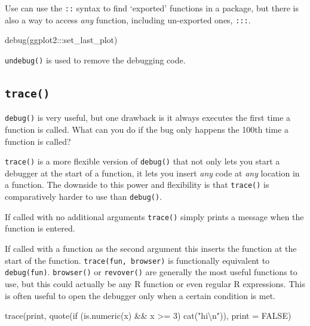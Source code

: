 \documentclass[
  letterpaper,
]{book}
\newenvironment{Shaded}{\begin{snugshade}}{\end{snugshade}}
\newcommand{\AttributeTok}[1]{\textcolor[rgb]{0.40,0.45,0.13}{#1}}
\newcommand{\ConstantTok}[1]{\textcolor[rgb]{0.56,0.35,0.01}{#1}}
\newcommand{\ControlFlowTok}[1]{\textcolor[rgb]{0.00,0.23,0.31}{#1}}
\newcommand{\DecValTok}[1]{\textcolor[rgb]{0.68,0.00,0.00}{#1}}
\newcommand{\FunctionTok}[1]{\textcolor[rgb]{0.28,0.35,0.67}{#1}}
\newcommand{\NormalTok}[1]{\textcolor[rgb]{0.00,0.23,0.31}{#1}}
\newcommand{\SpecialCharTok}[1]{\textcolor[rgb]{0.37,0.37,0.37}{#1}}
\newcommand{\StringTok}[1]{\textcolor[rgb]{0.13,0.47,0.30}{#1}}
\begin{document}
Use can use the \texttt{::} syntax to find `exported' functions in a
package, but there is also a way to access \emph{any} function,
including un-exported ones, \texttt{:::}.

\begin{Shaded}
\begin{Highlighting}[]
\FunctionTok{debug}\NormalTok{(ggplot2}\SpecialCharTok{:::}\NormalTok{set\_last\_plot)}
\end{Highlighting}
\end{Shaded}

\texttt{undebug()} is used to remove the debugging code.

\hypertarget{trace}{%
\subsection*{\texorpdfstring{\texttt{trace()}}{trace()}}\label{trace}}

\texttt{debug()} is very useful, but one drawback is it always executes
the first time a function is called. What can you do if the bug only
happens the 100th time a function is called?

\texttt{trace()} is a more flexible version of \texttt{debug()} that not
only lets you start a debugger at the start of a function, it lets you
insert \emph{any} code at \emph{any} location in a function. The
downside to this power and flexibility is that \texttt{trace()} is
comparatively harder to use than \texttt{debug()}.

If called with no additional arguments \texttt{trace()} simply prints a
message when the function is entered.

If called with a function as the second argument this inserts the
function at the start of the function. \texttt{trace(fun,\ browser)} is
functionally equivalent to \texttt{debug(fun)}. \texttt{browser()} or
\texttt{revover()} are generally the most useful functions to use, but
this could actually be any R function or even regular R expressions.
This is often useful to open the debugger only when a certain condition
is met.

\begin{Shaded}
\begin{Highlighting}[]
\FunctionTok{trace}\NormalTok{(print, }\FunctionTok{quote}\NormalTok{(}\ControlFlowTok{if}\NormalTok{ (}\FunctionTok{is.numeric}\NormalTok{(x) }\SpecialCharTok{\&\&}\NormalTok{ x }\SpecialCharTok{\textgreater{}=} \DecValTok{3}\NormalTok{) }\FunctionTok{cat}\NormalTok{(}\StringTok{"hi}\SpecialCharTok{\textbackslash{}n}\StringTok{"}\NormalTok{)), }\AttributeTok{print =} \ConstantTok{FALSE}\NormalTok{)}
\end{Highlighting}
\end{Shaded}
\end{document}
